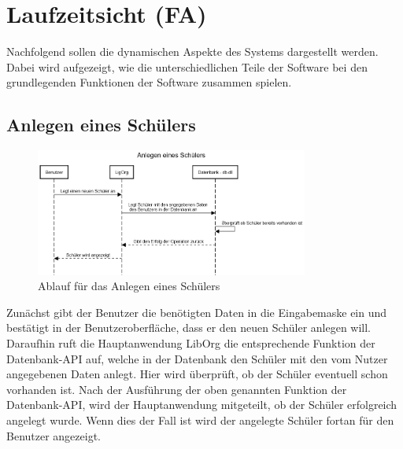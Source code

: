 \section{Laufzeitsicht (FA)}
Nachfolgend sollen die dynamischen Aspekte des Systems dargestellt werden. Dabei wird aufgezeigt, wie die unterschiedlichen Teile der Software bei den grundlegenden Funktionen der Software zusammen spielen.

\subsection{Anlegen eines Schülers}
\begin{figure}[H]
	\centering
	\includegraphics[width=0.80\textwidth]{figures/laufzeit/newstudent.png}
	\caption{Ablauf für das Anlegen eines Schülers}
	\label{fig:newstudent}
\end{figure}
Zunächst gibt der Benutzer die benötigten Daten in die Eingabemaske ein und bestätigt in der Benutzeroberfläche, dass er den neuen Schüler anlegen will. Daraufhin ruft die Hauptanwendung LibOrg die entsprechende Funktion der Datenbank-API auf, welche in der Datenbank den Schüler mit den vom Nutzer angegebenen Daten anlegt. Hier wird überprüft, ob der Schüler eventuell schon vorhanden ist. Nach der Ausführung der oben genannten Funktion der Datenbank-API, wird der Hauptanwendung mitgeteilt, ob der Schüler erfolgreich angelegt wurde. Wenn dies der Fall ist wird der angelegte Schüler fortan für den Benutzer angezeigt.

